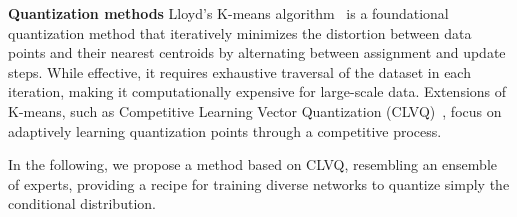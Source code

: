 \textbf{Quantization methods}
Lloyd's K-means algorithm~\citep{lloyd1982least} is a foundational quantization method that iteratively minimizes the distortion between data points and their nearest centroids by alternating between assignment and update steps. While effective, it requires exhaustive traversal of the dataset in each iteration, making it computationally expensive for large-scale data. Extensions of K-means, such as Competitive Learning Vector Quantization (CLVQ)~\citep{kohonen1995clvq, PagesBouton}, focus on adaptively learning quantization points through a competitive process.

In the following, we propose a method based on CLVQ, resembling an ensemble of experts, providing a recipe for training diverse networks to quantize simply the conditional distribution.